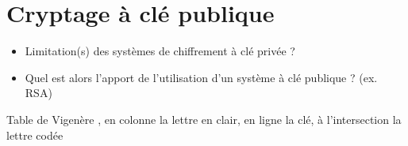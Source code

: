 \section{Cryptage à clé publique}

\begin{itemize}
  \item Limitation(s) des systèmes de chiffrement à clé privée ?
  \item Quel est alors l'apport de l'utilisation d'un système à clé publique ? (ex. RSA)
\end{itemize}



\noindent{}
\begin{table}[h]
\begin{tiny}

\caption{Table de Vigenère \label{tab:vigenere}, en colonne la lettre en clair, en ligne la clé, à l'intersection la lettre codée}
\end{tiny}
\end{table}
